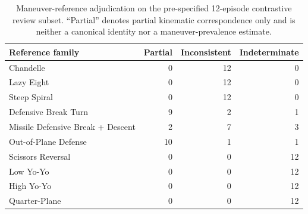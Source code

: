 \begin{table}[!t]
\centering
\small
\setlength{\tabcolsep}{5pt}
\renewcommand{\arraystretch}{1.08}
\caption{Maneuver-reference adjudication on the pre-specified 12-episode
contrastive review subset. ``Partial'' denotes partial kinematic correspondence
only and is neither a canonical identity nor a maneuver-prevalence estimate.}
\label{tab:manual-adjudication}
\begin{tabular}{@{}lrrr@{}}
\toprule
Reference family & Partial & Inconsistent & Indeterminate \\
\midrule
Chandelle                          & 0  & 12 & 0  \\
Lazy Eight                         & 0  & 12 & 0  \\
Steep Spiral                       & 0  & 12 & 0  \\
Defensive Break Turn               & 9  & 2  & 1  \\
Missile Defensive Break + Descent  & 2  & 7  & 3  \\
Out-of-Plane Defense               & 10 & 1  & 1  \\
Scissors Reversal                  & 0  & 0  & 12 \\
Low Yo-Yo                          & 0  & 0  & 12 \\
High Yo-Yo                         & 0  & 0  & 12 \\
Quarter-Plane                      & 0  & 0  & 12 \\
\bottomrule
\end{tabular}
\end{table}

